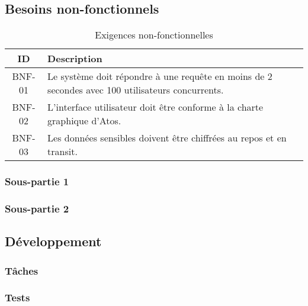 \subsection{Besoins non-fonctionnels}
\label{sec:besoins_non_fonctionnels}
\lipsum[4]
\begin{table}[H]
    \centering
    \caption{Exigences non-fonctionnelles}
    \label{tab:besoins_non_fonctionnels}
    \begin{tabularx}{\textwidth}{c X}
        \toprule
        \textbf{ID} & \textbf{Description} \\
        \midrule
        BNF-01 & Le système doit répondre à une requête en moins de 2 secondes avec 100 utilisateurs concurrents. \\
        BNF-02 & L'interface utilisateur doit être conforme à la charte graphique d'Atos. \\
        BNF-03 & Les données sensibles doivent être chiffrées au repos et en transit. \\
        \bottomrule
    \end{tabularx}
\end{table}

\subsubsection{Sous-partie 1}
\label{ssec:besoins_non_fonc_1}

\subsubsection{Sous-partie 2}
\label{ssec:besoins_non_fonc_2}

\subsection{Développement}
\label{sec:developpement}
\subsubsection{Tâches}
\label{ssec:taches}

\subsubsection{Tests}
\label{ssec:tests}
